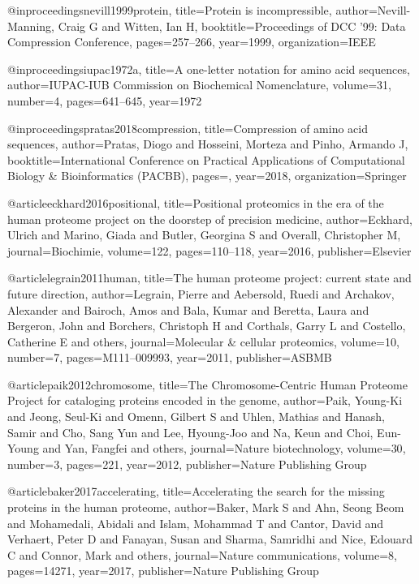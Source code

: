 @inproceedings{nevill1999protein,
  title={Protein is incompressible},
  author={Nevill-Manning, Craig G and Witten, Ian H},
  booktitle={Proceedings of DCC '99: Data Compression Conference},
  pages={257--266},
  year={1999},
  organization={IEEE}
}

@inproceedings{iupac1972a,
  title={A one-letter notation for amino acid sequences},
  author={{IUPAC-IUB Commission on Biochemical Nomenclature}},
  volume={31},
  number={4},
  pages={641--645},
  year={1972}
}

@inproceedings{pratas2018compression,
  title={Compression of amino acid sequences},
  author={Pratas, Diogo and Hosseini, Morteza and Pinho, Armando J},
  booktitle={International Conference on Practical Applications of Computational Biology \& Bioinformatics (PACBB)},
  pages={},
  year={2018},
  organization={Springer}
}

@article{eckhard2016positional,
  title={Positional proteomics in the era of the human proteome project on the doorstep of precision medicine},
  author={Eckhard, Ulrich and Marino, Giada and Butler, Georgina S and Overall, Christopher M},
  journal={Biochimie},
  volume={122},
  pages={110--118},
  year={2016},
  publisher={Elsevier}
}

@article{legrain2011human,
  title={The human proteome project: current state and future direction},
  author={Legrain, Pierre and Aebersold, Ruedi and Archakov, Alexander and Bairoch, Amos and Bala, Kumar and Beretta, Laura and Bergeron, John and Borchers, Christoph H and Corthals, Garry L and Costello, Catherine E and others},
  journal={Molecular \& cellular proteomics},
  volume={10},
  number={7},
  pages={M111--009993},
  year={2011},
  publisher={ASBMB}
}

@article{paik2012chromosome,
  title={The Chromosome-Centric Human Proteome Project for cataloging proteins encoded in the genome},
  author={Paik, Young-Ki and Jeong, Seul-Ki and Omenn, Gilbert S and Uhlen, Mathias and Hanash, Samir and Cho, Sang Yun and Lee, Hyoung-Joo and Na, Keun and Choi, Eun-Young and Yan, Fangfei and others},
  journal={Nature biotechnology},
  volume={30},
  number={3},
  pages={221},
  year={2012},
  publisher={Nature Publishing Group}
}

@article{baker2017accelerating,
  title={Accelerating the search for the missing proteins in the human proteome},
  author={Baker, Mark S and Ahn, Seong Beom and Mohamedali, Abidali and Islam, Mohammad T and Cantor, David and Verhaert, Peter D and Fanayan, Susan and Sharma, Samridhi and Nice, Edouard C and Connor, Mark and others},
  journal={Nature communications},
  volume={8},
  pages={14271},
  year={2017},
  publisher={Nature Publishing Group}
}

